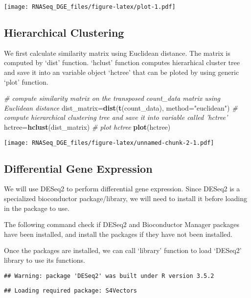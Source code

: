 \documentclass[]{article}
\newenvironment{Shaded}{\begin{snugshade}}{\end{snugshade}}
\newcommand{\KeywordTok}[1]{\textcolor[rgb]{0.13,0.29,0.53}{\textbf{#1}}}
\newcommand{\DataTypeTok}[1]{\textcolor[rgb]{0.13,0.29,0.53}{#1}}
\newcommand{\StringTok}[1]{\textcolor[rgb]{0.31,0.60,0.02}{#1}}
\newcommand{\CommentTok}[1]{\textcolor[rgb]{0.56,0.35,0.01}{\textit{#1}}}
\newcommand{\NormalTok}[1]{#1}
\begin{document}
\texttt{[image: RNASeq\_DGE\_files/figure-latex/plot-1.pdf]}

\subsection{Hierarchical Clustering}\label{hierarchical-clustering}

We first calculate similarity matrix using Euclidean distance. The
matrix is computed by `dist' function. `hclust' function computes
hierarhical cluster tree and save it into an variable object `hctree'
that can be ploted by using generic `plot' function.

\begin{Shaded}
\begin{Highlighting}[]
\CommentTok{# compute similarity matrix on the transposed count_data matrix using Euclidean distance}
\NormalTok{dist_matrix=}\KeywordTok{dist}\NormalTok{(}\KeywordTok{t}\NormalTok{(count_data), }\DataTypeTok{method=}\StringTok{"euclidean"}\NormalTok{)}
\CommentTok{# compute hierarchical clustering tree and save it into variable called 'hctree'}
\NormalTok{hctree=}\KeywordTok{hclust}\NormalTok{(dist_matrix)}
\CommentTok{# plot hctree}
\KeywordTok{plot}\NormalTok{(hctree)}
\end{Highlighting}
\end{Shaded}

\texttt{[image: RNASeq\_DGE\_files/figure-latex/unnamed-chunk-2-1.pdf]}

\subsection{Differential Gene
Expression}\label{differential-gene-expression}

We will use DESeq2 to perform differential gene expression. Since DESeq2
is a specialized bioconductor package/library, we will need to install
it before loading in the package to use.

The following command check if DESeq2 and Bioconductor Manager packages
have been installed, and install the packages if they have not been
installed.

Once the packages are installed, we can call `library' function to load
`DESeq2' library to use its functions.

\begin{verbatim}
## Warning: package 'DESeq2' was built under R version 3.5.2
\end{verbatim}

\begin{verbatim}
## Loading required package: S4Vectors
\end{verbatim}
\end{document}
